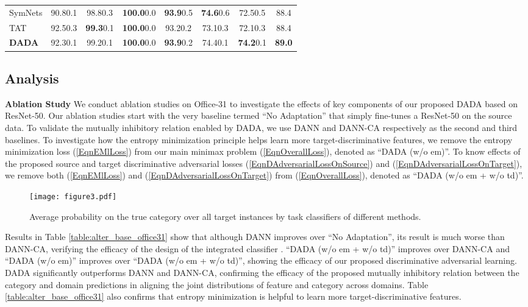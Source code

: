 \documentclass[letterpaper]{article} \usepackage{aaai20}  \usepackage{times}  \usepackage{helvet} \usepackage{courier}  \usepackage[hyphens]{url}  \usepackage{graphicx} \urlstyle{rm} \def\UrlFont{\rm}  \usepackage{graphicx}  \frenchspacing  \setlength{\pdfpagewidth}{8.5in}  \setlength{\pdfpageheight}{11in}
\begin{document}
\begin{table*}[!ht]
\begin{center}
{\begin{tabular}{lccccccc}
				SymNets \cite{symnets}          & 90.80.1 & 98.80.3 & \textbf{100.0}0.0 & \textbf{93.9}0.5 & \textbf{74.6}0.6 & 72.50.5 & 88.4 \\
				
				TAT \cite{tat}                  & 92.50.3 & \textbf{99.3}0.1 & \textbf{100.0}0.0 & 93.20.2 & 73.10.3 & 72.10.3 & 88.4 \\
				\hline
				\textbf{DADA}              & 92.30.1 & 99.20.1 & \textbf{100.0}0.0 & \textbf{93.9}0.2 & 74.40.1 & \textbf{74.2}0.1 & \textbf{89.0} \\
				\hline
			\end{tabular}
		}
	\end{center}
\end{table*}

\subsection{Analysis} 

\noindent\textbf{Ablation Study} We conduct ablation studies on Office-31 to investigate the effects of key components of our proposed DADA based on ResNet-50. Our ablation studies start with the very baseline termed ``No Adaptation'' that simply fine-tunes a ResNet-50 on the source data. To validate the mutually inhibitory relation enabled by DADA, we use DANN \cite{dann} and DANN-CA \cite{dann_ca} respectively as the second and third baselines. To investigate how the entropy minimization principle helps learn more target-discriminative features, we remove the entropy minimization loss (\ref{EqnEMlLoss}) from our main minimax problem (\ref{EqnOverallLoss}), denoted as ``DADA (w/o em)''. To know effects of the proposed source and target discriminative adversarial losses (\ref{EqnDAdversarialLossOnSource}) and (\ref{EqnDAdversarialLossOnTarget}), we remove both (\ref{EqnEMlLoss}) and (\ref{EqnDAdversarialLossOnTarget}) from (\ref{EqnOverallLoss}), denoted as ``DADA (w/o em + w/o td)''. 

\begin{figure}[t]
	\centering
	\texttt{[image: figure3.pdf]}
	\caption{Average probability on the true category over all target instances by task classifiers of different methods. 
	}
	\label{fig:avg_prob}
\end{figure}

Results in Table \ref{table:alter_base_office31} show that although DANN improves over ``No Adaptation'', its result is much worse than DANN-CA, verifying the efficacy of the design of the integrated classifier . ``DADA (w/o em + w/o td)'' improves over DANN-CA and ``DADA (w/o em)'' improves over ``DADA (w/o em + w/o td)'', showing the efficacy of our proposed discriminative adversarial learning. DADA significantly outperforms DANN and DANN-CA, confirming the efficacy of the proposed mutually inhibitory relation between the category and domain predictions in aligning the joint distributions of feature and category across domains. Table \ref{table:alter_base_office31} also confirms that entropy minimization is helpful to learn more target-discriminative features.
\end{document}
